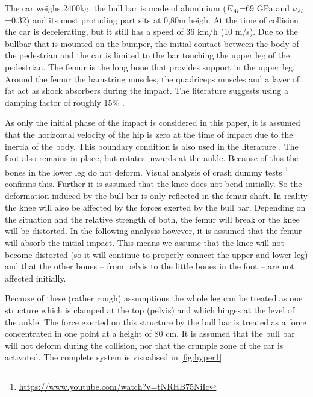 The car weighs 2400kg,  the bull bar is made of aluminium ($E_{Al}$=69 GPa and
$\nu_{Al}$=0,32)
and its most protuding part sits at 0,80m heigh. At the time of collision the
car is decelerating, but it still has a speed of 36 km/h (10 m/s). Due to the
bullbar that is mounted on the bumper, the initial contact between the body of
the pedestrian and the car is limited to the bar touching the upper leg of the
pedestrian. The femur is the long bone that provides support in the upper leg.
Around the femur the hamstring muscles, the quadriceps muscles and a layer of
fat act as shock absorbers during the impact. The literature suggests using a
damping factor of roughly 15\% \cite{kannus1999comparison}.

As only the initial phase of the impact is considered in this paper, it is
assumed that the horizontal velocity of the hip is zero at the time of impact
due to the inertia of the body. This boundary condition is also used in the
literature \cite{snedeker2005assessing}. The foot also remains in place, but
rotates inwards at the ankle. Because of this the bones in the lower leg do not
deform. Visual analysis of crash dummy tests
\footnote{\url{https://www.youtube.com/watch?v=tNRHB75NiIc}} confirms this.
Further it is assumed that the knee does not bend initially. So the deformation
induced by the bull bar is only reflected in the femur shaft. In reality the
knee will also be affected by the forces exerted by the bull bar.
Depending on the situation and the relative strength of both, the femur will
break or the knee will be distorted. In the following analysis however, it is
assumed that the femur will absorb the initial impact. This means we assume that
the knee will not become distorted (so it will continue to properly connect the
upper and lower leg) and that the other bones -- from pelvis to the little bones
in the foot -- are not affected initially.

Because of these (rather rough) assumptions the whole leg can be treated as one
structure which is clamped at the top (pelvis) and which hinges at the level of
the ankle. The force exerted on this structure by the bull bar is treated as a
force concentrated in one point at a height of 80 cm. It is assumed that the
bull bar will not deform during the collision, nor that the crumple zone of the
car is activated. The complete system is visualised in \autoref{fig:hyper1}.

